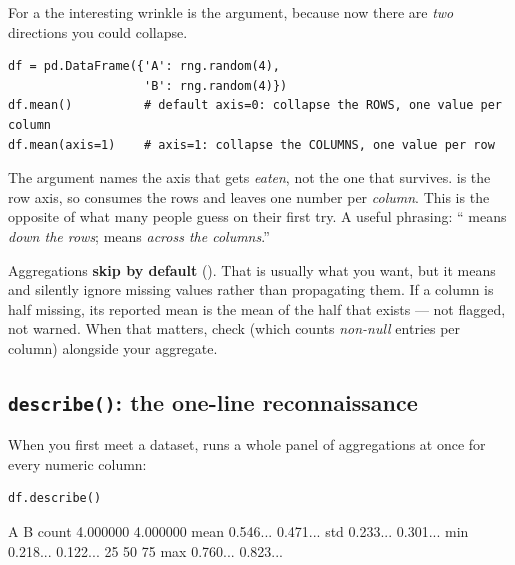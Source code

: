 \documentclass[11pt]{article}
\begin{document}
For a  the interesting wrinkle is the  argument, because now there are \emph{two} directions you could collapse.

\begin{lstlisting}
df = pd.DataFrame({'A': rng.random(4),
                   'B': rng.random(4)})
df.mean()          # default axis=0: collapse the ROWS, one value per column
df.mean(axis=1)    # axis=1: collapse the COLUMNS, one value per row
\end{lstlisting}

\begin{intuition}
The  argument names the axis that gets \emph{eaten}, not the one that survives.  is the row axis, so  consumes the rows and leaves one number per \emph{column}. This is the opposite of what many people guess on their first try. A useful phrasing: `` means \emph{down the rows};  means \emph{across the columns}.''
\end{intuition}

\begin{pitfall}
Aggregations \textbf{skip  by default} (). That is usually what you want, but it means  and  silently ignore missing values rather than propagating them. If a column is half missing, its reported mean is the mean of the half that exists --- not flagged, not warned. When that matters, check  (which counts \emph{non-null} entries per column) alongside your aggregate.
\end{pitfall}

\subsection{\texttt{describe()}: the one-line reconnaissance}

When you first meet a dataset,  runs a whole panel of aggregations at once for every numeric column:

\begin{lstlisting}
df.describe()
\end{lstlisting}

\begin{outblock}
              A         B
count  4.000000  4.000000
mean   0.546...  0.471...
std    0.233...  0.301...
min    0.218...  0.122...
25%
50%
75%
max    0.760...  0.823...
\end{outblock}
\end{document}
